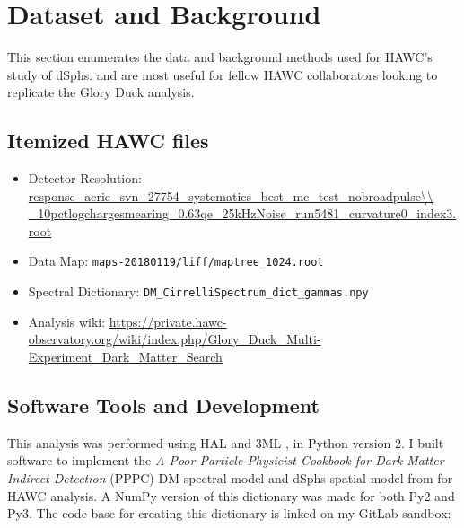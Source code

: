 \section{Dataset and Background}\label{sec:gd_databgd}

This section enumerates the data and background methods used for HAWC's study of dSphs.
 and  are most useful for fellow HAWC collaborators looking to replicate the Glory Duck analysis.

\subsection{Itemized HAWC files}\label{sec:gd_data}
\begin{itemize}
    \item Detector Resolution: \url{response\_aerie\_svn\_27754\_systematics\_best\_mc\_test\_nobroadpulse\\
    \_10pctlogchargesmearing\_0.63qe\_25kHzNoise\_run5481\_curvature0\_index3.root}
    \item Data Map: \texttt{maps-20180119/liff/maptree\_1024.root}
    \item Spectral Dictionary: \texttt{DM\_CirrelliSpectrum\_dict\_gammas.npy}
    \item Analysis wiki: \url{https://private.hawc-observatory.org/wiki/index.php/Glory_Duck_Multi-Experiment_Dark_Matter_Search}
\end{itemize}

\subsection{Software Tools and Development}\label{sec:gd_tools}

This analysis was performed using HAL and 3ML \cite{Abeysekara_2017, vianello2015multimission}, in Python version 2.
I built software to implement the \emph{A Poor Particle Physicist Cookbook for Dark Matter Indirect Detection} (PPPC) \cite{Cirelli_2011} DM spectral model and dSphs spatial model from \cite{Geringer_Sameth_2015} for HAWC analysis.
A NumPy version of this dictionary was made for both Py2 and Py3.
The code base for creating this dictionary is linked on my GitLab sandbox:


